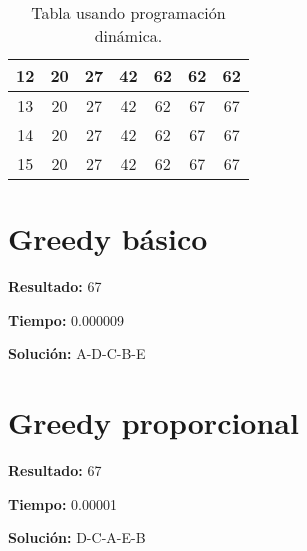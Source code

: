 \documentclass[a4paper]{article}
\begin{document}
\begin{table}[H]
\begin{tabular}{|c|c|c|c|c|c|c|}
\hline
12 & 20 \cellcolor{green!50} & 27 \cellcolor{green!50} & 42 \cellcolor{green!50} & 62 \cellcolor{green!50} & 62 \cellcolor{red!50} & 62 \cellcolor{red!50} \\
\hline
13 & 20 \cellcolor{green!50} & 27 \cellcolor{green!50} & 42 \cellcolor{green!50} & 62 \cellcolor{green!50} & 67 \cellcolor{green!50} & 67 \cellcolor{red!50} \\
\hline
14 & 20 \cellcolor{green!50} & 27 \cellcolor{green!50} & 42 \cellcolor{green!50} & 62 \cellcolor{green!50} & 67 \cellcolor{green!50} & 67 \cellcolor{red!50} \\
\hline
15 & 20 \cellcolor{green!50} & 27 \cellcolor{green!50} & 42 \cellcolor{green!50} & 62 \cellcolor{green!50} & 67 \cellcolor{green!50} & 67 \cellcolor{red!50} \\
\hline
\end{tabular}
\caption{Tabla usando programación dinámica.}
\end{table}
\section{Greedy básico}
\textbf{Resultado:} 67

\textbf{Tiempo:} 0.000009

\textbf{Solución:} A-D-C-B-E\section{Greedy proporcional}
\textbf{Resultado:} 67

\textbf{Tiempo:} 0.00001

\textbf{Solución:} D-C-A-E-B
\end{document}
